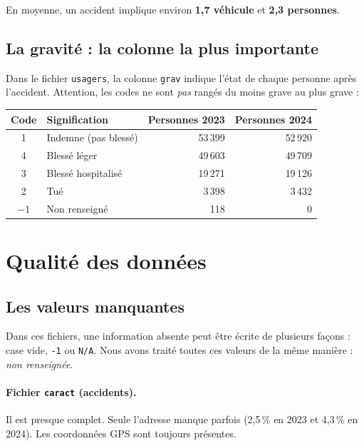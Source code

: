 \documentclass[11pt,a4paper]{article}
\begin{document}
En moyenne, un accident implique environ \textbf{1,7 véhicule} et
\textbf{2,3 personnes}.

\subsection{La gravité : la colonne la plus importante}

Dans le fichier \texttt{usagers}, la colonne \texttt{grav} indique l'état de
chaque personne après l'accident. Attention, les codes ne sont \emph{pas}
rangés du moins grave au plus grave :

\begin{center}
\begin{tabular}{@{}c l r r@{}}
  \toprule
  \textbf{Code} & \textbf{Signification} & \textbf{Personnes 2023} & \textbf{Personnes 2024} \\
  \midrule
  1 & Indemne (pas blessé)  & 53\,399 & 52\,920 \\
  4 & Blessé léger          & 49\,603 & 49\,709 \\
  3 & Blessé hospitalisé    & 19\,271 & 19\,126 \\
  2 & Tué                   &  3\,398 &  3\,432 \\
  $-1$ & Non renseigné      &     118 &       0 \\
  \bottomrule
\end{tabular}
\end{center}

\section{Qualité des données}

\subsection{Les valeurs manquantes}

Dans ces fichiers, une information absente peut être écrite de plusieurs
façons : case vide, \texttt{-1} ou \texttt{N/A}. Nous avons traité toutes ces
valeurs de la même manière : \emph{non renseignée}.

\paragraph{Fichier \texttt{caract} (accidents).} Il est presque complet. Seule
l'adresse manque parfois (2,5\,\% en 2023 et 4,3\,\% en 2024). Les
coordonnées GPS sont toujours présentes.
\end{document}
